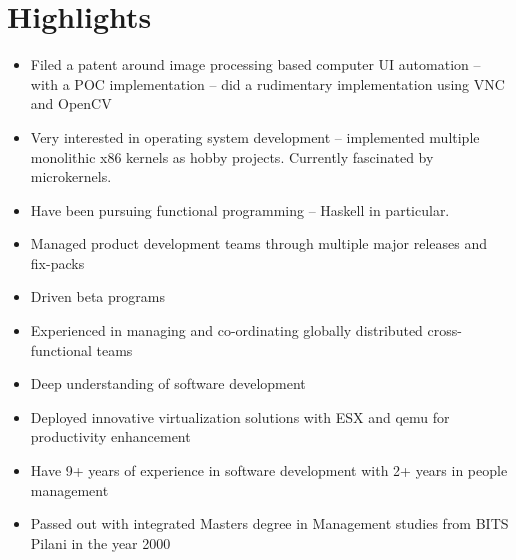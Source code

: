 \documentclass [a4paper,11pt] {article}
\begin{document}
\section*{Highlights}
\begin{itemize}
\item Filed a patent around image processing based computer UI automation –
with a POC implementation – did a rudimentary implementation using VNC and
OpenCV

\item Very interested in operating system development – implemented multiple
monolithic x86 kernels as hobby projects. Currently fascinated by microkernels.

\item Have been pursuing functional programming – Haskell in particular.

\item Managed product development teams through multiple major releases and
fix-packs  

\item Driven beta programs

\item Experienced in managing and co-ordinating globally distributed
cross-functional teams

\item Deep understanding of software development

\item Deployed innovative virtualization solutions with ESX and qemu for
productivity enhancement

\item Have 9+ years of experience in software development with 2+ years in
people management

\item Passed out with integrated Masters degree in Management studies from BITS
Pilani in the year 2000
\end{itemize}
\end{document}
